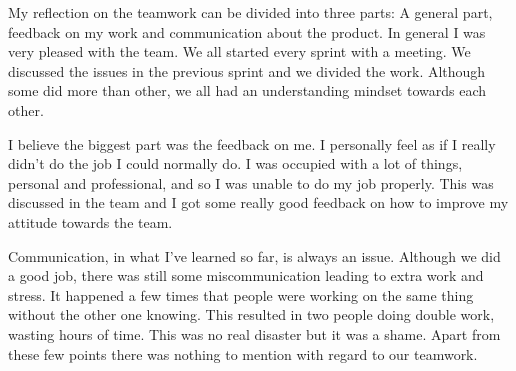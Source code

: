 \documentclass[a4paper]{article}
\begin{document}
My reflection on the teamwork can be divided into three parts: A general part, feedback on my work and communication about the product.
In general I was very pleased with the team. We all started every sprint with a meeting. We discussed the issues in the previous sprint and we divided the work. Although some did more than other, we all had an understanding mindset towards each other.

I believe the biggest part was the feedback on me. I personally feel as if I really didn't do the job I could normally do. I was occupied with a lot of things, personal and professional, and so I was unable to do my job properly. This was discussed in the team and I got some really good feedback on how to improve my attitude towards the team. 

Communication, in what I've learned so far, is always an issue. Although we did a good job, there was still some miscommunication leading to extra work and stress. It happened a few times that people were working on the same thing without the other one knowing. This resulted in two people doing double work, wasting hours of time. This was no real disaster but it was a shame. Apart from these few points there was nothing to mention with regard to our teamwork.
\end{document}

